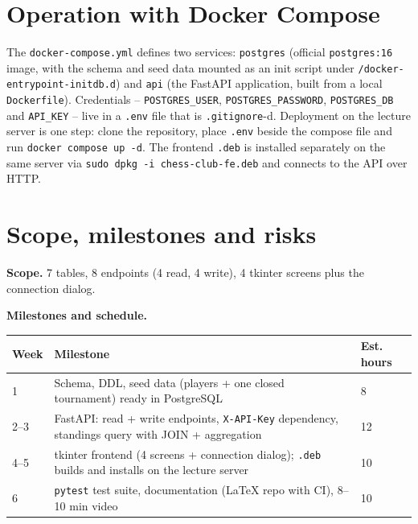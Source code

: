 \documentclass[11pt,a4paper]{article}
\begin{document}
\section{Operation with Docker Compose}

The \texttt{docker-compose.yml} defines two services: \texttt{postgres}
(official \texttt{postgres:16} image, with the schema and seed data mounted as
an init script under \texttt{/docker-entrypoint-initdb.d}) and \texttt{api}
(the FastAPI application, built from a local \texttt{Dockerfile}). Credentials
-- \texttt{POSTGRES\_USER}, \texttt{POSTGRES\_PASSWORD}, \texttt{POSTGRES\_DB}
and \texttt{API\_KEY} -- live in a \texttt{.env} file that is
\texttt{.gitignore}-d. Deployment on the lecture server is one
step: clone the repository, place \texttt{.env} beside the compose file and run
\texttt{docker compose up -d}. The frontend \texttt{.deb} is installed
separately on the same server via \texttt{sudo dpkg -i chess-club-fe.deb} and
connects to the API over HTTP.

\section{Scope, milestones and risks}

\textbf{Scope.} 7 tables, 8 endpoints (4 read, 4 write), 4 tkinter screens plus
the connection dialog.

\textbf{Milestones and schedule.}

\renewcommand{\arraystretch}{1.2}
\begin{tabularx}{\linewidth}{@{}p{1.4cm}Xp{1.8cm}@{}}
\toprule
\textbf{Week} & \textbf{Milestone} & \textbf{Est. hours} \\
\midrule
1     & Schema, DDL, seed data (players + one closed tournament) ready in PostgreSQL & 8 \\
2--3  & FastAPI: read + write endpoints, \texttt{X-API-Key} dependency, standings query with JOIN + aggregation & 12 \\
4--5  & tkinter frontend (4 screens + connection dialog); \texttt{.deb} builds and installs on the lecture server & 10 \\
6     & \texttt{pytest} test suite, documentation (LaTeX repo with CI), 8--10 min video & 10 \\
\bottomrule
\end{tabularx}
\end{document}
